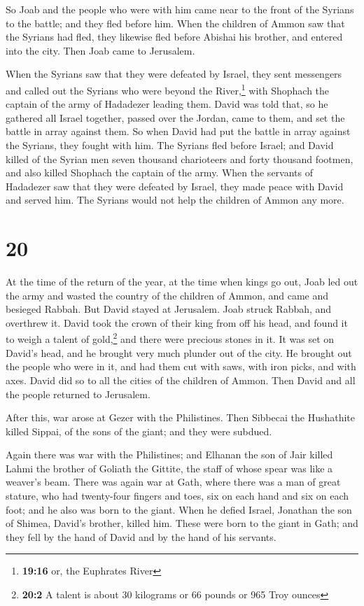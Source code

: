  So Joab and the people who were with him came near to
the front of the Syrians to the battle; and they fled before him.
 When the children of Ammon saw that the Syrians had
fled, they likewise fled before Abishai his brother, and entered into
the city. Then Joab came to Jerusalem.

 When the Syrians saw that they were defeated by Israel,
they sent messengers and called out the Syrians who were beyond the
River,\footnote{\textbf{19:16} or, the Euphrates River} with Shophach
the captain of the army of Hadadezer leading them.  David
was told that, so he gathered all Israel together, passed over the
Jordan, came to them, and set the battle in array against them. So when
David had put the battle in array against the Syrians, they fought with
him.  The Syrians fled before Israel; and David killed of
the Syrian men seven thousand charioteers and forty thousand footmen,
and also killed Shophach the captain of the army.  When
the servants of Hadadezer saw that they were defeated by Israel, they
made peace with David and served him. The Syrians would not help the
children of Ammon any more.

\hypertarget{section-19}{%
\section{20}\label{section-19}}

 At the time of the return of the year, at the time when
kings go out, Joab led out the army and wasted the country of the
children of Ammon, and came and besieged Rabbah. But David stayed at
Jerusalem. Joab struck Rabbah, and overthrew it.  David
took the crown of their king from off his head, and found it to weigh a
talent of gold,\footnote{\textbf{20:2} A talent is about 30 kilograms or
  66 pounds or 965 Troy ounces} and there were precious stones in it. It
was set on David's head, and he brought very much plunder out of the
city.  He brought out the people who were in it, and had
them cut with saws, with iron picks, and with axes. David did so to all
the cities of the children of Ammon. Then David and all the people
returned to Jerusalem.

 After this, war arose at Gezer with the Philistines. Then
Sibbecai the Hushathite killed Sippai, of the sons of the giant; and
they were subdued.

 Again there was war with the Philistines; and Elhanan the
son of Jair killed Lahmi the brother of Goliath the Gittite, the staff
of whose spear was like a weaver's beam.  There was again
war at Gath, where there was a man of great stature, who had twenty-four
fingers and toes, six on each hand and six on each foot; and he also was
born to the giant.  When he defied Israel, Jonathan the
son of Shimea, David's brother, killed him.  These were
born to the giant in Gath; and they fell by the hand of David and by the
hand of his servants.

